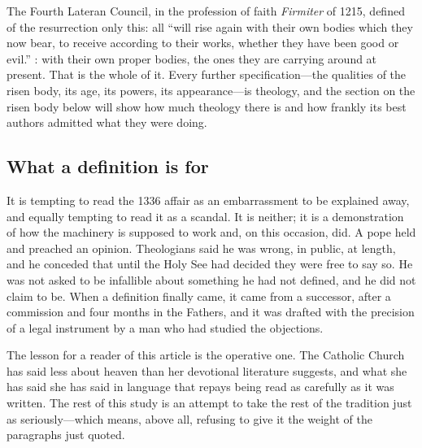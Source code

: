 The Fourth Lateran Council, in the profession of faith \emph{Firmiter} of 1215, defined of the resurrection only this: all ``will rise again with their own bodies which they now bear, to receive according to their works, whether they have been good or evil.'' : with their own proper bodies, the ones they are carrying around at present. That is the whole of it. Every further specification---the qualities of the risen body, its age, its powers, its appearance---is theology, and the section on the risen body below will show how much theology there is and how frankly its best authors admitted what they were doing.

\subsection{What a definition is for}

It is tempting to read the 1336 affair as an embarrassment to be explained away, and equally tempting to read it as a scandal. It is neither; it is a demonstration of how the machinery is supposed to work and, on this occasion, did. A pope held and preached an opinion. Theologians said he was wrong, in public, at length, and he conceded that until the Holy See had decided they were free to say so. He was not asked to be infallible about something he had not defined, and he did not claim to be. When a definition finally came, it came from a successor, after a commission and four months in the Fathers, and it was drafted with the precision of a legal instrument by a man who had studied the objections.

The lesson for a reader of this article is the operative one. The Catholic Church has said less about heaven than her devotional literature suggests, and what she has said she has said in language that repays being read as carefully as it was written. The rest of this study is an attempt to take the rest of the tradition just as seriously---which means, above all, refusing to give it the weight of the paragraphs just quoted.
